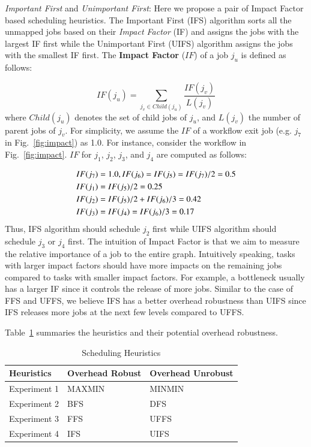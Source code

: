 \emph{Important First} and \emph{Unimportant First}: Here we propose a pair of Impact Factor based scheduling heuristics. The Important First (IFS) algorithm sorts all the unmapped jobs based on their \emph{Impact Factor} (IF) and assigns the jobs with the largest IF first while the Unimportant First (UIFS) algorithm assigns the jobs with the smallest IF first. 
The \textbf{Impact Factor} ($IF$) of a job $j_u$ is defined as follows:

\begin{equation}
	IF(j_u)=\sum_{j_v\in Child(j_u)}^{}\frac{IF(j_v)}{L(j_v)}
\end{equation}
where $Child(j_u)$ denotes the set of child jobs of $j_u$, and $L(j_v)$ the number of parent jobs of $j_v$. For simplicity, we assume the $IF$ of a workflow exit job (e.g. $j_7$ in Fig.~\ref{fig:impact}) as 1.0. For instance, consider the workflow in Fig.~\ref{fig:impact}. $IF$ for $j_1$, $j_2$, $j_3$, and $j_4$ are computed as follows:

\begin{eqnarray}
	\displaystyle  
	&IF(j_7 )=1.0, IF(j_6 )=IF(j_5 )=IF(j_7 )/2=0.5\nonumber  \\
	&IF(j_1 )=IF(j_5)/2=0.25\nonumber \\
	&IF(j_2 )=IF(j_5 )/2+IF(j_6)/3=0.42\nonumber \\
	&IF(j_3 )=IF(j_4 )=IF(j_6 )/3=0.17\nonumber 
\end{eqnarray}
Thus, IFS algorithm should schedule $j_2$ first while UIFS algorithm should schedule $j_3$ or $j_4$ first. The intuition of Impact Factor is that we aim to measure the relative importance of a job to the entire graph. Intuitively speaking, tasks with larger impact factors should have more impacts on the remaining jobs compared to tasks with smaller impact factors. For example, a bottleneck usually has a larger IF since it controls the release of more jobs. 
Similar to the case of FFS and UFFS, we believe IFS has a better overhead robustness than UIFS since IFS releases more jobs at the next few levels compared to UFFS. 


Table~\ref{tab:heuristics} summaries the heuristics and their potential overhead robustness. 
\begin{table}[H]
\caption{Scheduling Heuristics}
\begin{center}
  \begin{tabular}{ l|l|l}
    \hline
Heuristics & Overhead Robust & Overhead Unrobust \\ \hline
    Experiment 1 & MAXMIN & MINMIN \\ \hline
   Experiment 2 & BFS & DFS \\ \hline
 Experiment 3 & FFS & UFFS \\ \hline
Experiment 4 & IFS & UIFS\\
    \hline
  \end{tabular}
\label{tab:heuristics}
\end{center}
\end{table}

